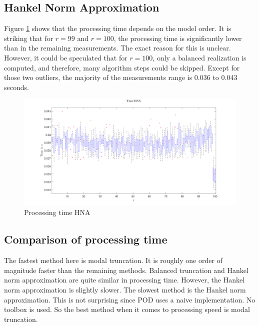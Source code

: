 \subsection{Hankel Norm Approximation}
Figure \ref{FIG-T-HNA} shows that the processing time depends on the model order.
It is striking that for \(r = 99\) and \(r = 100\), the processing time is significantly lower than in the remaining measurements.
The exact reason for this is unclear. However, it could be speculated that for \(r=100\), only a balanced realization is computed, and therefore, many algorithm steps could be skipped.
Except for those two outliers, the majority of the measurements range is 0.036 to 0.043 seconds.
\begin{figure}[H]
\centering
\includegraphics[width=\textwidth]{images/time/HNA}
\caption{Processing time HNA}
\label{FIG-T-HNA}
\end{figure}

\subsection{Comparison of processing time}
The fastest method here is modal truncation.
It is roughly one order of magnitude faster than the remaining methods.
Balanced truncation and Hankel norm approximation are quite similar in processing time. However, the Hankel norm approximation is slightly slower.
The slowest method is the Hankel norm approximation.
This is not surprising since POD uses a naive implementation. No toolbox is used.
So the best method when it comes to processing speed is modal truncation.










